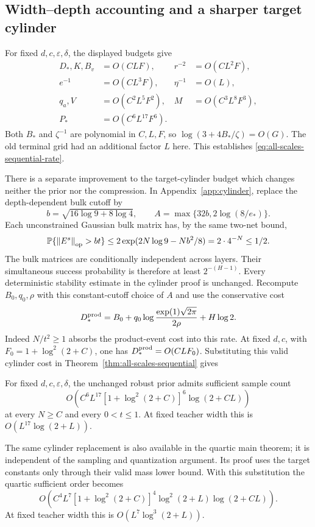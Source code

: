 \subsection{Width--depth accounting and a sharper target cylinder}

For fixed $d,c,\varepsilon,\delta$, the displayed budgets give
\begin{align*}
 D_*,K,B_v&=O(CLF),&r^{-2}&=O(CL^2F),\\
 e^{-1}&=O(CL^3F),&\eta^{-1}&=O(L),\\
 q_a,V&=O(C^2L^5F^2),&M&=O(C^3L^8F^3),\\
 P_*&=O(C^6L^{17}F^6).
\end{align*}
Both $B_*$ and $\zeta^{-1}$ are polynomial in $C,L,F$, so
$\log(3+4B_*/\zeta)=O(G)$. The old terminal grid had an additional
factor $L$ here. This establishes \eqref{eq:all-scales-sequential-rate}.

There is a separate improvement to the target-cylinder budget which
changes neither the prior nor the compression. In
Appendix~\ref{app:cylinder}, replace the depth-dependent bulk cutoff by
\[
 b=\sqrt{16\log9+8\log4},\qquad
 A=\max\{32b,2\log(8/e_*)\}.
\]
Each unconstrained Gaussian bulk matrix has, by the same two-net bound,
\[
 \mathbb P\{\left\|E^s\right\|_{\rm op}>bt\}
 \le2\exp(2N\log9-Nb^2/8)=2\cdot4^{-N}\le1/2.
\]
The bulk matrices are conditionally independent across layers.
Their simultaneous success probability is therefore at least
$2^{-(H-1)}$. Every deterministic stability estimate in the cylinder
proof is unchanged. Recompute $B_0,q_0,\rho$ with this constant-cutoff
choice of $A$ and use the conservative cost
\begin{equation}\label{eq:product-cylinder-cost}
 D_*^{\rm prod}=B_0+q_0\log\frac{\exp(1)\sqrt{2\pi}}{2\rho}+H\log2.
\end{equation}
Indeed $N/t^2\ge1$ absorbs the product-event cost into this rate.
At fixed $d,c$, with $F_0=1+\log^2(2+C)$, one has
$D_*^{\rm prod}=O(CLF_0)$. Substituting this valid cylinder cost in
Theorem~\ref{thm:all-scales-sequential} gives
\begin{corollary}
\label{cor:all-scales-product-cylinder}
For fixed $d,c,\varepsilon,\delta$, the unchanged robust prior admits
sufficient sample count
\[
 O\!\left(C^6L^{17}[1+\log^2(2+C)]^6\log(2+CL)\right)
\]
at every $N\ge C$ and every $0<t\le1$. At fixed teacher width this is
$O(L^{17}\log(2+L))$.
\end{corollary}
The same cylinder replacement is also available in the quartic main
theorem; it is independent of the sampling and quantization argument.
Its proof uses the target constants only through their valid mass lower
bound. With this substitution the quartic sufficient order becomes
\[
 O\!\left(C^4L^7[1+\log^2(2+C)]^4\log^2(2+L)\log(2+CL)\right).
\]
At fixed teacher width this is $O(L^7\log^3(2+L))$.

